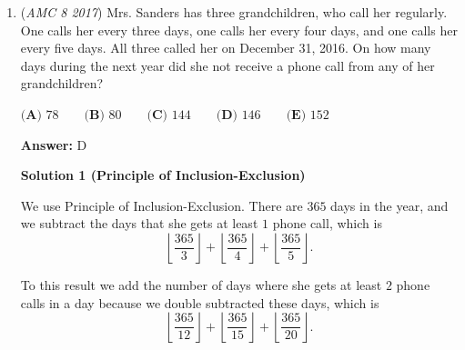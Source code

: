 \begin{enumerate}
 $\textbf{(A) }10\qquad\textbf{(B) }15\qquad\textbf{(C) }25\qquad\textbf{(D) }50\qquad\textbf{(E) }82$

 \textbf{Answer: }C



\textbf{Solution}

It is well known that $\text{Distance}=\text{Speed} \cdot \text{Time}$. In the question, we want distance. From the question, we have that the time is $60$ minutes or $1$ hour.  By the equation derived from $\text{Distance}=\text{Speed} \cdot \text{Time}$, we have $\text{Speed}=\frac{\text{Distance}}{\text{Time}}$, so the speed is $1$ mile per $x$ minutes. Because we want the distance, we multiply the time and speed together yielding $60\text{ mins}\cdot \frac{1\text{ mile}}{x\text{ mins}}$. The minutes cancel out, so now we have $\dfrac{60}{x}$ as our distance for the first day. The distance for the following days are:
 \[\dfrac{60}{x},\dfrac{60}{x+5},\dfrac{60}{x+10},\dfrac{60}{x+15}.\]We know that $x,x+5,x+10,x+15$ are all factors of $60$, therefore, $x=5$ because the factors have to be in an arithmetic sequence with the common difference being $5$ and $x=5$ is the only solution.
 \[\dfrac{60}{5}+\dfrac{60}{10}+\dfrac{60}{15}+\dfrac{60}{20}=12+6+4+3=\boxed{\textbf{(C)}\ 25}.\]



	\item (\textit{AMC 8 2017}) Mrs. Sanders has three grandchildren, who call her regularly. One calls her every three days, one calls her every four days, and one calls her every five days. All three called her on December 31, 2016. On how many days during the next year did she not receive a phone call from any of her grandchildren?


 $\textbf{(A) }78\qquad\textbf{(B) }80\qquad\textbf{(C) }144\qquad\textbf{(D) }146\qquad\textbf{(E) }152$

 \textbf{Answer: }D



\textbf{Solution 1 (Principle of Inclusion-Exclusion)}

We use Principle of Inclusion-Exclusion. There are $365$ days in the year, and we subtract the days that she gets at least $1$ phone call, which is 
 \[\left \lfloor \frac{365}{3} \right \rfloor +  \left \lfloor \frac{365}{4} \right \rfloor +  \left \lfloor \frac{365}{5} \right \rfloor.\]

 To this result we add the number of days where she gets at least $2$ phone calls in a day because we double subtracted these days, which is 
 \[\left \lfloor \frac{365}{12} \right \rfloor +  \left \lfloor \frac{365}{15} \right \rfloor +  \left \lfloor \frac{365}{20} \right \rfloor.\]


\end{enumerate}
